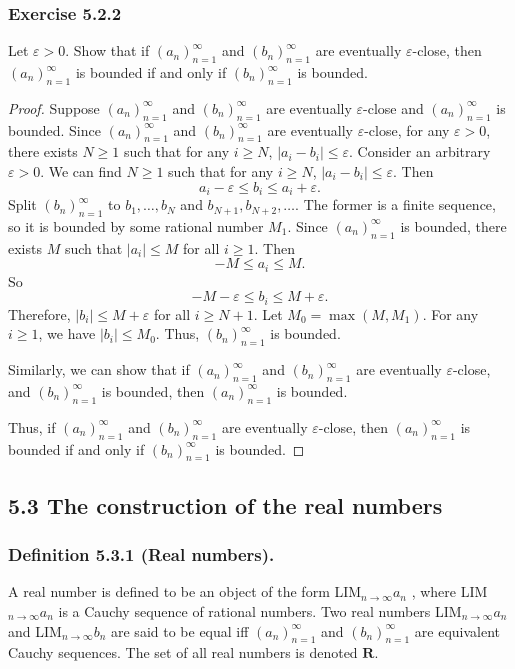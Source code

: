 \documentclass[12pt, letter]{article}
\newcommand{\an}{$(a_n)_{n=1}^\infty$ }
\newcommand{\bn}{$(b_n)_{n=1}^\infty$ }
\newcommand{\la}{LIM$_{n\to\infty}a_n$ }
\newcommand{\lb}{LIM$_{n\to\infty}b_n$ }
\begin{document}
\subsubsection*{Exercise 5.2.2}
Let $\varepsilon>0$. Show that if $(a_n)_{n=1}^\infty$ and $(b_n)_{n=1}^\infty$ are eventually $\varepsilon$-close, then \an is bounded if and only if \bn is bounded.
\begin{proof}
    Suppose $(a_n)_{n=1}^\infty$ and $(b_n)_{n=1}^\infty$ are eventually $\varepsilon$-close and \an is bounded. Since $(a_n)_{n=1}^\infty$ and $(b_n)_{n=1}^\infty$ are eventually $\varepsilon$-close,
    for any $\varepsilon>0$, there exists $N\geq 1$ such that for any $i\geq N$, $|a_i-b_i|\leq\varepsilon$. Consider an arbitrary $\varepsilon>0$. We can find $N\geq 1$ such that for any 
    $i\geq N$, $|a_i-b_i|\leq \varepsilon$. Then 
    \begin{equation*}
        a_i-\varepsilon\leq b_i\leq a_i+\varepsilon.
    \end{equation*}
    Split \bn to $b_1,\dotsc,b_{N}$ and $b_{N+1},b_{N+2},\dotsc$. The former is a finite sequence, so it is bounded by some rational number $M_1$. Since \an is bounded, there exists $M$ such that $|a_i|\leq M$ for all $i\geq 1$. Then 
    \begin{equation*}
        -M\leq a_i\leq M.
    \end{equation*}
    So
    \begin{equation*}
        -M-\varepsilon\leq b_i\leq M+\varepsilon.
    \end{equation*}
    Therefore, $|b_i|\leq M+\varepsilon$ for all $i\geq N+1$. Let $M_0=\max(M,M_1)$. For any $i\geq 1$, we have $|b_i|\leq M_0$. Thus, \bn is bounded. 

    Similarly, we can show that if $(a_n)_{n=1}^\infty$ and $(b_n)_{n=1}^\infty$ are eventually $\varepsilon$-close, and \bn is bounded, then \an is bounded.

    Thus, if $(a_n)_{n=1}^\infty$ and $(b_n)_{n=1}^\infty$ are eventually $\varepsilon$-close, then \an is bounded if and only if \bn is bounded. 
\end{proof}
\subsection*{5.3 The construction of the real numbers}
\subsubsection*{Definition 5.3.1 (Real numbers).}
A real number is defined to be an object of the form \la, where \la is a Cauchy sequence of rational numbers. Two real numbers \la and \lb are said to be equal iff 
\an and \bn are equivalent Cauchy sequences. The set of all real numbers is denoted $\mathbf{R}$.
\end{document}
